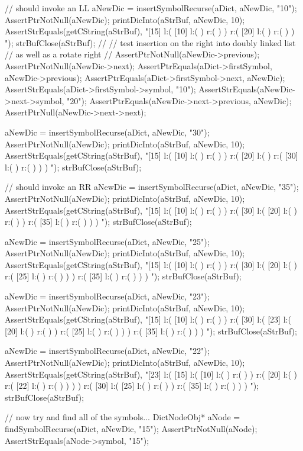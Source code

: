   // should invoke an LL
  aNewDic = insertSymbolRecurse(aDict, aNewDic, "10");
  AssertPtrNotNull(aNewDic);
  printDicInto(aStrBuf, aNewDic, 10);
  AssertStrEquals(getCString(aStrBuf),
  "[15] l:( [10] l:(  ) r:(  )  ) r:( [20] l:(  ) r:(  )  ) ");
  strBufClose(aStrBuf);
  //
  // test insertion on the right into doubly linked list
  // as well as a rotate right
  //
  AssertPtrNotNull(aNewDic->previous);
  AssertPtrNotNull(aNewDic->next);
  AssertPtrEquals(aDict->firstSymbol, aNewDic->previous);
  AssertPtrEquals(aDict->firstSymbol->next, aNewDic);
  AssertStrEquals(aDict->firstSymbol->symbol, "10");
  AssertStrEquals(aNewDic->next->symbol, "20");
  AssertPtrEquals(aNewDic->next->previous, aNewDic);
  AssertPtrNull(aNewDic->next->next);

  aNewDic = insertSymbolRecurse(aDict, aNewDic, "30");
  AssertPtrNotNull(aNewDic);
  printDicInto(aStrBuf, aNewDic, 10);
  AssertStrEquals(getCString(aStrBuf),
  "[15] l:( [10] l:(  ) r:(  )  ) r:( [20] l:(  ) r:( [30] l:(  ) r:(  )  )  ) ");
  strBufClose(aStrBuf);
  
  // should invoke an RR
  aNewDic = insertSymbolRecurse(aDict, aNewDic, "35");
  AssertPtrNotNull(aNewDic);
  printDicInto(aStrBuf, aNewDic, 10);
  AssertStrEquals(getCString(aStrBuf),
  "[15] l:( [10] l:(  ) r:(  )  ) r:( [30] l:( [20] l:(  ) r:(  )  ) r:( [35] l:(  ) r:(  )  )  ) ");
  strBufClose(aStrBuf);

  aNewDic = insertSymbolRecurse(aDict, aNewDic, "25");
  AssertPtrNotNull(aNewDic);
  printDicInto(aStrBuf, aNewDic, 10);
  AssertStrEquals(getCString(aStrBuf),
  "[15] l:( [10] l:(  ) r:(  )  ) r:( [30] l:( [20] l:(  ) r:( [25] l:(  ) r:(  )  )  ) r:( [35] l:(  ) r:(  )  )  ) ");
  strBufClose(aStrBuf);

  aNewDic = insertSymbolRecurse(aDict, aNewDic, "23");
  AssertPtrNotNull(aNewDic);
  printDicInto(aStrBuf, aNewDic, 10);
  AssertStrEquals(getCString(aStrBuf),
  "[15] l:( [10] l:(  ) r:(  )  ) r:( [30] l:( [23] l:( [20] l:(  ) r:(  )  ) r:( [25] l:(  ) r:(  )  )  ) r:( [35] l:(  ) r:(  )  )  ) ");
  strBufClose(aStrBuf);
  
  aNewDic = insertSymbolRecurse(aDict, aNewDic, "22");
  AssertPtrNotNull(aNewDic);
  printDicInto(aStrBuf, aNewDic, 10);
  AssertStrEquals(getCString(aStrBuf),
  "[23] l:( [15] l:( [10] l:(  ) r:(  )  ) r:( [20] l:(  ) r:( [22] l:(  ) r:(  )  )  )  ) r:( [30] l:( [25] l:(  ) r:(  )  ) r:( [35] l:(  ) r:(  )  )  ) ");
  strBufClose(aStrBuf);
  
  // now try and find all of the symbols...
  DictNodeObj* aNode = findSymbolRecurse(aDict, aNewDic, "15");
  AssertPtrNotNull(aNode);
  AssertStrEquals(aNode->symbol, "15");

